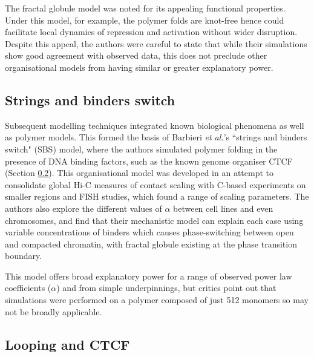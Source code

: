\documentclass[a4paper,11pt,oneside]{book}
\begin{document}

The fractal globule model was noted for its appealing functional properties. Under this model, for example, the polymer folds are knot-free hence could facilitate local dynamics of repression and activation without wider disruption. Despite this appeal, the authors were careful to state that while their simulations show good agreement with observed data, this does not preclude other organisational models from having similar or greater explanatory power.\cite{Lieberman2009}

\subsection{Strings and binders switch}\label{intro:sbs}

Subsequent modelling techniques integrated known biological phenomena as well as polymer models. This formed the basis of Barbieri \emph{et al.}'s\cite{Barbieri2012} ``strings and binders switch" (SBS) model, where the authors simulated polymer folding in the presence of DNA binding factors, such as the known genome organiser CTCF (Section \ref{intro:loops}). This organisational model was developed in an attempt to consolidate global Hi-C measures of contact scaling with C-based experiments on smaller regions and FISH studies, which found a range of scaling parameters. The authors also explore the different values of $\alpha$ between cell lines and even chromosomes, and find that their mechanistic model can explain each case using variable concentrations of binders which causes phase-switching between open and compacted chromatin, with fractal globule existing at the phase transition boundary.

This model offers broad explanatory power for a range of observed power law coefficients ($\alpha$) and from simple underpinnings, but critics point out that simulations were performed on a polymer composed of just 512 monomers so may not be broadly applicable.\cite{Dekker2013}

\subsection{Looping and CTCF}\label{intro:loops}
\end{document}
